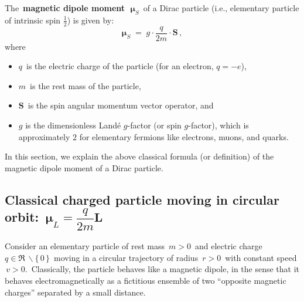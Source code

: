 The \,\textbf{magnetic dipole moment}\, \,$\boldsymbol{\mu}_{S}$\,
of a Dirac particle (i.e., elementary particle of intrinsic spin $\frac{1}{2}$)
is given by:
\begin{equation*}
\boldsymbol{\mu}_{S}
\; = \;
    g \cdot \dfrac{q}{2m} \cdot \mathbf{S}\,,
\end{equation*}
where
\begin{itemize}
\item
    $q$\, is the electric charge of the particle (for an electron, $q = -e$),
\item
    $m$\, is the rest mass of the particle,
\item
    $\mathbf{S}$\, is the spin angular momentum vector operator, and
\item
    $g$ is the dimensionless Landé $g$-factor (or spin $g$-factor), which is approximately $2$ for elementary fermions like electrons, muons, and quarks.
\end{itemize}
In this section, we explain the above classical formula (or definition)
of the magnetic dipole moment of a Dirac particle.


\vskip 0.5cm
\subsection{Classical charged particle moving in circular orbit: \,$\boldsymbol{\mu}_{L} = \dfrac{q}{2m}\mathbf{L}$}


\noindent
Consider an elementary particle of rest mass \,$m > 0$\, and
electric charge \,$q \in \Re\,\backslash\{\,0\,\}$\,
moving in a circular trajectory of radius \,$r > 0$\,
with constant speed \,$v > 0$.\,
Classically, the particle behaves like a magnetic dipole,
in the sense that it behaves electromagnetically
as a fictitious ensemble of two ``opposite magnetic charges''
separated by a small distance.

